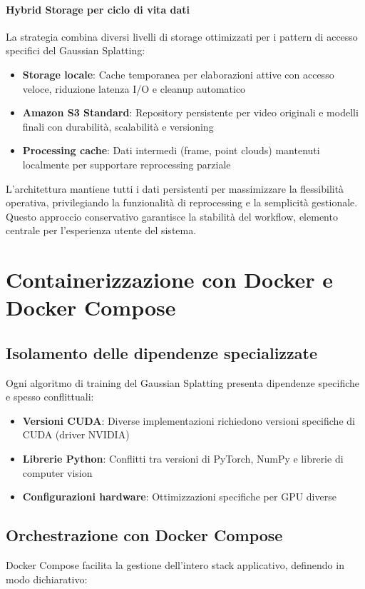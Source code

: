 \paragraph{Hybrid Storage per ciclo di vita dati}
La strategia combina diversi livelli di storage ottimizzati per i pattern di accesso specifici del Gaussian Splatting:

\begin{itemize}
	\item \textbf{Storage locale}: Cache temporanea per elaborazioni attive con accesso veloce, riduzione latenza I/O e cleanup automatico
	\item \textbf{Amazon S3 Standard}: Repository persistente per video originali e modelli finali con durabilità, scalabilità e versioning
	\item \textbf{Processing cache}: Dati intermedi (frame, point clouds) mantenuti localmente per supportare reprocessing parziale
\end{itemize}

L'architettura mantiene tutti i dati persistenti per massimizzare la flessibilità operativa, privilegiando la funzionalità di reprocessing e la semplicità gestionale. Questo approccio conservativo garantisce la stabilità del workflow, elemento centrale per l'esperienza utente del sistema.
\newpage
\section{Containerizzazione con Docker e Docker Compose}
\subsection{Isolamento delle dipendenze specializzate}
Ogni algoritmo di training del Gaussian Splatting presenta dipendenze specifiche e spesso conflittuali:

\begin{itemize}
    \item \textbf{Versioni CUDA}: Diverse implementazioni richiedono versioni specifiche di CUDA (driver NVIDIA)
    \item \textbf{Librerie Python}: Conflitti tra versioni di PyTorch, NumPy e librerie di computer vision
    \item \textbf{Configurazioni hardware}: Ottimizzazioni specifiche per GPU diverse
\end{itemize}

\subsection{Orchestrazione con Docker Compose}
Docker Compose facilita la gestione dell'intero stack applicativo, definendo in modo dichiarativo:

